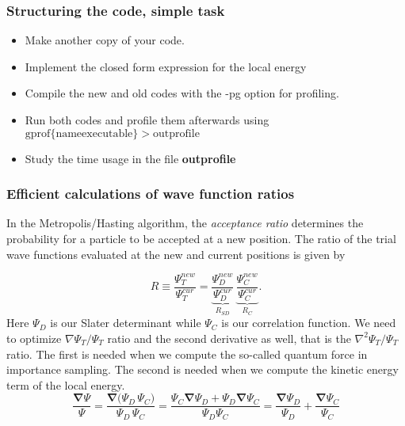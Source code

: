 \documentclass[compress]{beamer}
\newcommand{\Grad}[1]{\boldsymbol{\nabla}{#1}}
\begin{document}
\frame
{
  \frametitle{Structuring the code, simple task}
\begin{small}
{\scriptsize
\begin{itemize}
\item Make another copy of your code.
\item Implement the closed form expression for the local energy
\item Compile the new and old codes with the -pg option for profiling.
\item Run both codes and profile them afterwards using $\mathrm{gprof} \{\mathrm{name executable}\} > \mathrm{outprofile}$
\item Study the time usage in the file {\bf outprofile}
\end{itemize}
}
\end{small}
}


\frame
 {
   \frametitle{Efficient calculations of wave function ratios}
 \begin{small}
 {\scriptsize

In the Metropolis/Hasting algorithm, the \emph{acceptance ratio} determines the probability for a particle  to be accepted at a new position. The ratio of the trial wave functions evaluated at the new and current positions is given by

\begin{equation}\label{acceptanceRatio}
\boxed{R \equiv \frac{\Psi_{T}^{new}}{\Psi_{T}^{cur}} = \underbrace{\frac{\Psi_{D}^{new}}{\Psi_{D}^{cur}}}_{R_{SD}}\, \underbrace{\frac{\Psi_{C}^{new}}{\Psi_{C}^{cur}}}_{R_{C}}.}
\end{equation}
Here $\Psi_{D}$ is our Slater determinant while $\Psi_{C}$ is our correlation function. 
We need to optimize $\nabla \Psi_T / \Psi_T$ ratio and the second derivative as well, that is
the $\nabla^2 \Psi_T/\Psi_T$ ratio. The first is needed when we compute the so-called quantum force in importance sampling.
The second is needed when we compute the kinetic energy term of the local energy.
\[
\frac{\Grad \Psi}{\Psi}  = \frac{\Grad (\Psi_{D} \, \Psi_{C})}{\Psi_{D} \, \Psi_{C}}  =  \frac{ \Psi_C \Grad \Psi_{D} + \Psi_{D} \Grad \Psi_{C}}{\Psi_{D} \Psi_{C}} = \frac{\Grad \Psi_{D}}{\Psi_{D}} + \frac{\Grad  \Psi_C}{ \Psi_C}
\]
 }
 \end{small}
 }
\end{document}

